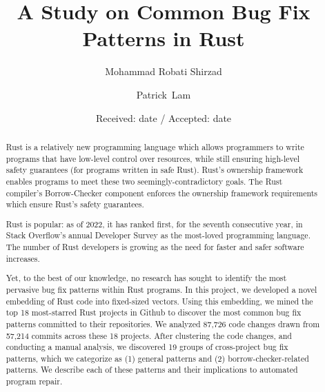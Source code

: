 \documentclass[smallextended]{svjour3}       %
\begin{document}
\title{A Study on Common Bug Fix Patterns in Rust%
}
\subtitle{}


\author{Mohammad Robati Shirzad         \and
        Patrick~Lam %
}



\date{Received: date / Accepted: date}


\maketitle

\begin{abstract}
    Rust is a relatively new programming language which allows programmers to write programs that have low-level control over resources, while still ensuring high-level safety guarantees (for programs written in safe Rust). Rust's ownership framework enables programs to meet these two seemingly-contradictory goals. The Rust compiler's Borrow-Checker component enforces the ownership framework requirements which ensure Rust's safety guarantees.

Rust is popular: as of 2022, it has ranked first, for the seventh consecutive year, in Stack Overflow's annual Developer Survey as the most-loved programming language. The number of Rust developers is growing as the need for faster and safer software increases. 

Yet, to the best of our knowledge, no research has sought to identify the most pervasive bug fix patterns within Rust programs. In this project, we developed a novel embedding of Rust code into fixed-sized vectors. Using this embedding, we mined the top 18 most-starred Rust projects in Github to discover the most common bug fix patterns committed to their repositories. We analyzed 87,726 code changes drawn from 57,214 commits across these 18 projects. After clustering the code changes, and conducting a manual analysis, we discovered 19 groups of cross-project bug fix patterns, which we categorize as (1) general patterns and (2) borrow-checker-related patterns. We describe each of these patterns and their implications to automated program repair.
\end{abstract}
\end{document}
